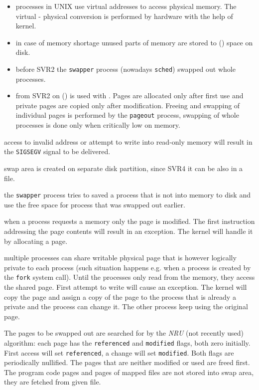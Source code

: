 
\begin{slide}
\begin{itemize}
\item processes in UNIX use virtual addresses to access physical memory.
The virtual - physical conversion is performed by hardware with the help
of kernel.
\item in case of memory shortage unused parts of memory are stored to
() space on disk.
\item before SVR2 the \texttt{swapper} process (nowadays
\texttt{sched}) swapped out whole processes.
\item from SVR2 on () is used with .
Pages are allocated only after first use and private pages are copied only
after modification. Freeing and swapping of individual pages is performed
by the \texttt{pageout} process, swapping of whole processes is done only
when critically low on memory.
\end{itemize}
\end{slide}

\begin{description}
\item[address translation:] access to invalid address or attempt to write into
read-only memory will result in the \texttt{SIGSEGV} signal to be delivered.
\item[swap:] swap area is created on separate disk partition, since
SVR4 it can be also in a file.
\item[swapper:] the \texttt{swapper} process tries to saved a process that is
not into memory to disk and use the free space for process that was swapped out
earlier.
\item[demand paging:] when a process requests a memory only the page is
modified. The first instruction addressing the page contents will result in an
exception. The kernel will handle it by allocating a page.
\item[copy-on-write:] multiple processes can share writable physical page that
is however logically private to each process (such situation happens e.g. when a
process is created by the \texttt{fork} system call). Until the processes only
read from the memory, they access the shared page. First attempt to write will
cause an exception. The kernel will copy the page and assign a copy of the
page to the process that is already a private and the process can change it.
The other process keep using the original page.
\item The pages to be swapped out are searched for by the \emph{NRU} (not
recently used) algorithm: each page has the \texttt{referenced} and
\texttt{modified} flags, both zero initially. First access will set
\texttt{referenced}, a change will set \texttt{modified}.
Both flags are periodically nullified. The pages that are neither modified or
used are freed first. The program code pages and pages of mapped files are not
stored into swap area, they are fetched from given file.
\end{description}


\endinput
